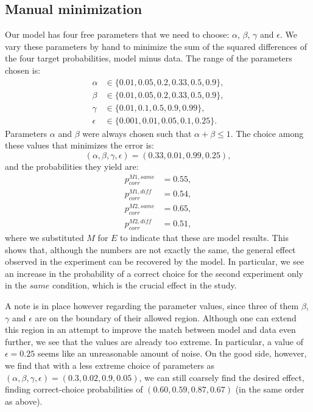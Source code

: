 \documentclass[11pt, a4paper]{article}
\begin{document}
\subsection*{Manual minimization}
Our model has four free parameters that we need to choose: $\alpha$, $\beta$, $\gamma$ and $\epsilon$. We vary these parameters by hand to minimize the sum of the squared differences of the four target probabilities, model minus data. The range of the parameters chosen is:
\begin{equation}
\begin{split}
\alpha&\in\{0.01, 0.05, 0.2, 0.33, 0.5, 0.9\},\\
\beta&\in\{0.01, 0.05, 0.2, 0.33, 0.5, 0.9\},\\
\gamma&\in\{0.01, 0.1, 0.5, 0.9, 0.99\},\\
\epsilon&\in\{0.001, 0.01, 0.05, 0.1, 0.25\}.
\end{split}
\end{equation}
Parameters $\alpha$ and $\beta$ were always chosen such that $\alpha+\beta\leq1$. The choice among these values that minimizes the error is:
\begin{equation}
(\alpha,\beta,\gamma,\epsilon)=(0.33,0.01,0.99,0.25),
\end{equation}
and the probabilities they yield are:
\begin{equation}
\begin{split}
p^{M1,same}_{corr}&=0.55,\\
p^{M1,diff}_{corr}&=0.54,\\
p^{M2,same}_{corr}&=0.65,\\
p^{M2,diff}_{corr}&=0.51,
\end{split}
\end{equation}
where we substituted $M$ for $E$ to indicate that these are model results. This shows that, although the numbers are not exactly the same, the general effect observed in the experiment can be recovered by the model. In particular, we see an increase in the probability of a correct choice for the second experiment only in the $same$ condition, which is the crucial effect in the study. 
 
A note is in place however regarding the parameter values, since three of them $\beta$, $\gamma$ and $\epsilon$ are on the boundary of their allowed region. Although one can extend this region in an attempt to improve the match between model and data even further, we see that the values are already too extreme. In particular, a value of $\epsilon=0.25$ seems like an unreasonable amount of noise. On the good side, however, 
we find that with a less extreme choice of parameters as $(\alpha,\beta,\gamma,\epsilon)=(0.3,0.02,0.9,0.05)$, we can still coarsely find the desired effect, finding correct-choice probabilities of $(0.60, 0.59, 0.87, 0.67)$ (in the same order as above). 
 
\end{document}
